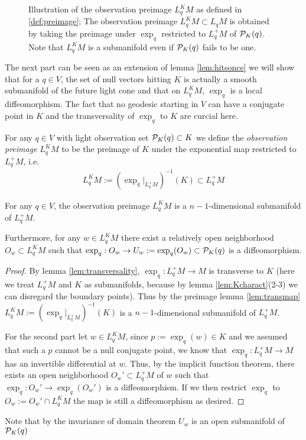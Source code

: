 \begin{figure}[h]\label{fig:LKDef}
    \centering
    
    \caption{
        Illustration of the observation preimage $L^K_qM$ as defined in \ref{def:preimage}; The observation preimage $L^K_qM\subset L_qM$ is obtained by taking the preimage under $\exp_q$ restricted to $L_q^+M$ of ${{\mathcal{P}}_K(q)}$. Note that $L^K_qM$ is a submanifold even if ${{\mathcal{P}}_K(q)}$ fails to be one.
    }
\end{figure}
The next part can be seen as an extension of lemma \ref{lem:hitsonce} we will show that for a $q\in V$, the set of null vectors hitting $K$ is actually a smooth submanifold of the future light cone and that on $L^K_qM$, $\exp_q$ is a local diffeomorphism. The fact that no geodesic starting in $V$ can have a conjugate point in $K$ and the transversality of $\exp_q$ to $K$ are curcial here. 
\begin{definition}\label{def:preimage}
For any $q\in V$ with light observation set ${\mathcal{P}}_K(q)\subset K$ we define the \emph{observation preimage} $L^K_qM$ to be the preimage of $K$ under the exponential map restricted to $L^+_qM$, i.e. 
\begin{align*}
    L^K_qM := (\exp_q\rvert_{L^+_qM})^{-1}(K) \subset L^+_qM
\end{align*}
\end{definition}
\begin{lemma}\label{lem:preimage}
For any $q\in V$, the observation preimage $L^K_qM$ is a $n-1$-dimensional submanifold of $L^+_qM$. 

Furthermore, for any $w\in L^K_qM$ there exist a relatively open neighborhood $O_w\subset L^K_qM$ such that $\exp_q:O_w\to U_w:=\exp_q(O_w)\subset {\mathcal{P}}_K(q)$ is a diffeomorphism.
\end{lemma}
\begin{proof}
    By lemma \ref{lem:transversality}, $\exp_q:L^+_qM\to M$ is transverse to $K$ (here we treat $L^+_qM$ and $K$ as submanifolds, because by lemma \ref{lem:Kcharact}(2-3) we can disregard the boundary points). Thus by the preimage lemma \ref{lem:transmap} $ L^K_qM := (\exp_q\rvert_{L^+_qM})^{-1}(K)$ is a $n-1$-dimensional submanifold of $L^+_qM$.

    For the second part let $w\in L^K_qM$, since $p:=\exp_q(w)\in K$ and we assumed that such a $p$ cannot be a null conjugate point, we know that $\exp_q:L^+_qM\to M$ has an invertible differential at $w$. Thus, by the implicit function theorem, there exists an open neighborhood $O_w'\subset L^+_qM$ of $w$ such that $\exp_q:O_w'\to \exp_q(O_w')$ is a diffeomorphism. If we then restrict $\exp_q$ to $O_w:=O_w' \cap L^K_qM$ the map is still a diffeomorphism as desired.
\end{proof}
Note that by the invariance of domain theorem $U_w$ is an open submanifold of ${\mathcal{P}}_K(q)$


